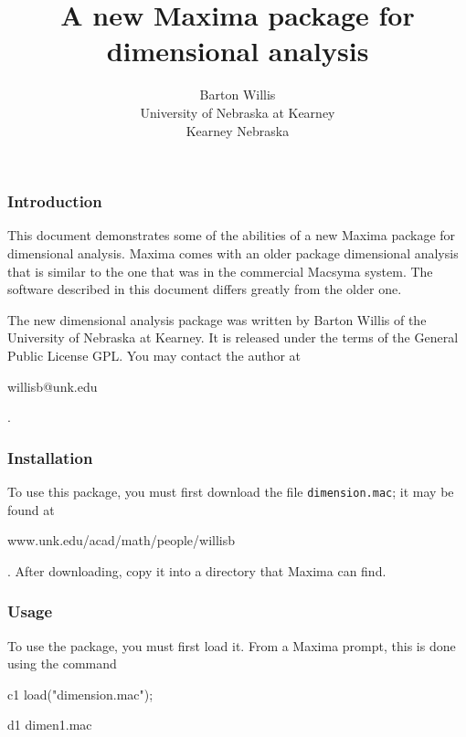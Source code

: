 \documentclass[12pt]{article}
\title{A new Maxima package for dimensional analysis}
\author{Barton Willis \\
  University of Nebraska at Kearney \\
  Kearney Nebraska}
\begin{document}
\maketitle


\subsubsection*{Introduction}

\noindent This document demonstrates some of the abilities
of a new Maxima package for dimensional analysis.  Maxima 
comes with an older package dimensional  analysis that is 
similar to the one that was in the commercial Macsyma system. 
The software described in this document differs greatly from 
the older one.

The new dimensional analysis package was written by Barton Willis of
the University of Nebraska at Kearney. It is released under the terms of 
the General Public License GPL. You may contact the author at
\begin{verb} willisb@unk.edu \end{verb}.


\subsubsection*{Installation}

To use this package, you must first download the file
{\tt dimension.mac}; it may be found at
\begin{verb} www.unk.edu/acad/math/people/willisb \end{verb}.
After downloading, copy it into a directory that Maxima
can find.


\subsubsection*{Usage}

To use the package, you must first load it. From a Maxima prompt, this
is done using the command

\vspace{0.1in}

\begin{mcline}{c1}
load("dimension.mac");
\end{mcline}

\begin{mdline}{d1}
dimen1.mac
\end{mdline}

\vspace{0.1in}
\end{document}
